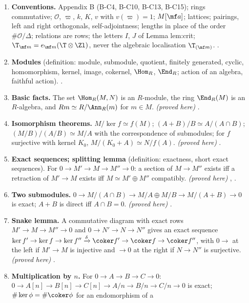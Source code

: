 \begin{enumerate}[label=\textbf{\thechapter.\arabic*}]
\item \textbf{Conventions.} Appendix B (B-C4, B-C10, B-C13, B-C15); rings commutative; $\mathcal O$, $\varpi$, $k$, $K$, $v$ with $v(\varpi)=1$; $M[\mf a]$; lattices;
pairings, left and right orthogonals, self-adjointness; lengths in place of the order $\#\mathcal O/\Delta$; relations are rows; the letters $I$, $J$ of
Lemma lem:crit; $\T_{\mf m}=e_{\mf m}(\T\otimes\Zl)$, never the algebraic localisation $\T_{(\mf m)}$. .
\item \textbf{Modules} (definition: module, submodule, quotient, finitely generated, cyclic, homomorphism, kernel, image, cokernel, $\Hom_R$, $\End_R$;
action of an algebra, faithful action). .
\item \textbf{Basic facts.} The set $\Hom_R(M,N)$ is an $R$-module, the ring $\End_R(M)$ is an $R$-algebra, and $Rm\simeq R/\Ann_R(m)$ for $m\in M$. \emph{(proved here)} .
\item \textbf{Isomorphism theorems.} $M/\ker f\simeq f(M)$; $(A+B)/B\simeq A/(A\cap B)$; $(M/B)/(A/B)\simeq M/A$ with the correspondence of submodules; for $f$
surjective with kernel $K_0$, $M/(K_0+A)\simeq N/f(A)$. \emph{(proved here)} .
\item \textbf{Exact sequences; splitting lemma} (definition: exactness, short exact sequences). For $0\to M'\to M\to M''\to0$: a section of $M\to M''$ exists iff a retraction of $M'\to M$ exists iff $M\simeq M'\oplus M''$ compatibly.
\emph{(proved here)} , .
\item \textbf{Two submodules.} $0\to M/(A\cap B)\to M/A\oplus M/B\to M/(A+B)\to0$ is exact; $A+B$ is direct iff $A\cap B=0$. \emph{(proved here)} .
\item \textbf{Snake lemma.} A commutative diagram with exact rows $M'\to M\to M''\to0$ and $0\to N'\to N\to N''$ gives an exact sequence
$\ker f'\to\ker f\to\ker f''\xrightarrow{\delta}\coker f'\to\coker f\to\coker f''$, with $0\to$ at the left if $M'\to M$ is injective and $\to0$ at the right if $N\to N''$ is surjective.
\emph{(proved here)} .
\item \textbf{Multiplication by $n$.} For $0\to A\to B\to C\to0$: $0\to A[n]\to B[n]\to C[n]\to A/n\to B/n\to C/n\to0$ is exact; $\#\ker\phi=\#\coker\phi$ for an endomorphism of a

\end{enumerate}

